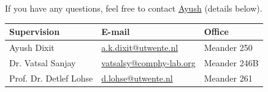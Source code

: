 \documentclass[a4paper,10pt]{article}
\begin{document}
If you have any questions, feel free to contact \href{mailto:a.k.dixit@utwente.nl}{Ayush} (details below).
\begin{center}
\begin{tabular}{|l|l|l|}
\hline \textbf{Supervision} & \textbf{E-mail} & \textbf{Office} \\
\hline Ayush Dixit & \href{mailto:a.k.dixit@utwente.nl}{a.k.dixit@utwente.nl} & Meander 250 \\
\hline Dr. Vatsal Sanjay & \href{mailto:vatsalsy@comphy-lab.org}{vatsalsy@comphy-lab.org} & Meander 246B \\
\hline Prof. Dr. Detlef Lohse & \href{mailto:d.lohse@utwente.nl}{d.lohse@utwente.nl} & Meander 261  \\
\hline
\end{tabular}
\end{center}

\printbibliography
\end{document}
